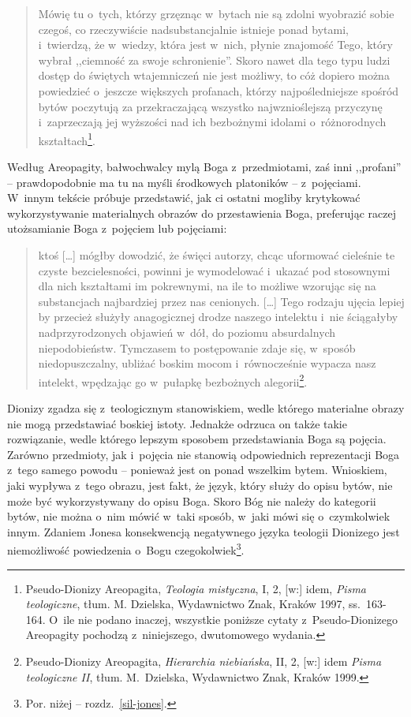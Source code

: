\begin{quote}
Mówię tu o~tych, którzy grzęznąc w~bytach nie są zdolni wyobrazić sobie czegoś, co rzeczywiście nadsubstancjalnie istnieje ponad bytami, i~twierdzą, że w~wiedzy, która jest w~nich, płynie znajomość Tego, który wybrał ,,ciemność za swoje schronienie''. Skoro nawet dla tego typu ludzi dostęp do świętych wtajemniczeń nie jest możliwy, to cóż dopiero można powiedzieć o~jeszcze większych profanach, którzy najpośledniejsze spośród bytów poczytują za przekraczającą wszystko najwznioślejszą przyczynę i~zaprzeczają jej wyższości nad ich bezbożnymi idolami o~różnorodnych kształtach\footnote{Pseudo-Dionizy Areopagita, \textit{Teologia mistyczna}, I, 2, [w:] idem, \textit{Pisma teologiczne}, tłum. M. Dzielska, Wydawnictwo Znak, Kraków 1997, ss.~163-164. O~ile nie podano inaczej, wszystkie poniższe cytaty z~Pseudo-Dionizego Areopagity pochodzą z~niniejszego, dwutomowego wydania.}.
\end{quote}

Według Areopagity, bałwochwalcy mylą Boga z~przedmiotami, zaś inni ,,profani'' -- prawdopodobnie ma tu na myśli środkowych platoników -- z~pojęciami. W~innym tekście próbuje przedstawić, jak ci ostatni mogliby krytykować wykorzystywanie materialnych obrazów do przestawienia Boga, preferując raczej utożsamianie Boga z~pojęciem lub pojęciami:

\begin{quote}
ktoś [\ldots] mógłby dowodzić, że święci autorzy, chcąc uformować cieleśnie te czyste bezcielesności, powinni je wymodelować i~ukazać pod stosownymi dla nich kształtami im pokrewnymi, na ile to możliwe wzorując się na substancjach najbardziej przez nas cenionych. [\ldots] Tego rodzaju ujęcia lepiej by przecież służyły anagogicznej drodze naszego intelektu i~nie ściągałyby nadprzyrodzonych objawień w~dół, do poziomu absurdalnych niepodobieństw. Tymczasem to postępowanie zdaje się, w~sposób niedopuszczalny, ubliżać boskim mocom i~równocześnie wypacza nasz intelekt, wpędzając go w~pułapkę bezbożnych alegorii\footnote{Pseudo-Dionizy Areopagita, \textit{Hierarchia niebiańska}, II, 2, [w:] idem  \textit{Pisma teologiczne II}, tłum. M.~Dzielska, Wydawnictwo Znak, Kraków 1999.}.
\end{quote}

Dionizy zgadza się z~teologicznym stanowiskiem, wedle którego materialne obrazy nie mogą przedstawiać boskiej istoty. Jednakże odrzuca on także takie rozwiązanie, wedle którego lepszym sposobem przedstawiania Boga są pojęcia. Zarówno przedmioty, jak i~pojęcia nie stanowią odpowiednich reprezentacji Boga z~tego samego powodu -- ponieważ jest on ponad wszelkim bytem. Wnioskiem, jaki wypływa z~tego obrazu, jest fakt, że język, który służy do opisu bytów, nie może być wykorzystywany do opisu Boga. Skoro Bóg nie należy do kategorii bytów, nie można o~nim mówić w~taki sposób, w~jaki mówi się o~czymkolwiek innym. Zdaniem Jonesa konsekwencją negatywnego języka teologii Dionizego jest niemożliwość powiedzenia o~Bogu czegokolwiek\footnote{Por. niżej -- rozdz.~\ref{sil-jones}.}.


